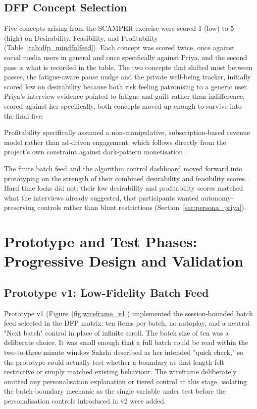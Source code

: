 \documentclass[11pt]{article}
\begin{document}
\subsection{DFP Concept Selection}
\label{sec:dfp_mindfulfeed}
Five concepts arising from the SCAMPER exercise were scored 1 (low) to 5 (high) on Desirability, Feasibility, and Profitability (Table~\ref{tab:dfp_mindfulfeed}). Each concept was scored twice, once against social media users in general and once specifically against Priya, and the second pass is what is recorded in the table. The two concepts that shifted most between passes, the fatigue-aware pause nudge and the private well-being tracker, initially scored low on desirability because both risk feeling patronising to a generic user. Priya's interview evidence pointed to fatigue and guilt rather than indifference; scored against her specifically, both concepts moved up enough to survive into the final five.

Profitability specifically assumed a non-manipulative, subscription-based revenue model rather than ad-driven engagement, which follows directly from the project's own constraint against dark-pattern monetisation \parencites[8]{4807303}.

The finite batch feed and the algorithm control dashboard moved forward into prototyping on the strength of their combined desirability and feasibility scores. Hard time locks did not: their low desirability and profitability scores matched what the interviews already suggested, that participants wanted autonomy-preserving controls rather than blunt restrictions (Section~\ref{sec:persona_priya}).

\section{Prototype and Test Phases: Progressive Design and Validation}
\label{sec:prototype_test_mindfulfeed}

\subsection{Prototype v1: Low-Fidelity Batch Feed}
Prototype v1 (Figure~\ref{fig:wireframe_v1}) implemented the session-bounded batch feed selected in the DFP matrix: ten items per batch, no autoplay, and a neutral "Next batch" control in place of infinite scroll. The batch size of ten was a deliberate choice. It was small enough that a full batch could be read within the two-to-three-minute window Sakshi described as her intended "quick check," so the prototype could actually test whether a boundary at that length felt restrictive or simply matched existing behaviour. The wireframe deliberately omitted any personalisation explanation or tiered control at this stage, isolating the batch-boundary mechanic as the single variable under test before the personalisation controls introduced in v2 were added.
\end{document}
